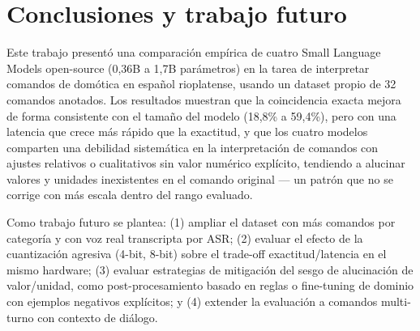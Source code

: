 \section{Conclusiones y trabajo futuro}

Este trabajo presentó una comparación empírica de cuatro Small Language
Models open-source (0,36B a 1,7B parámetros) en la tarea de interpretar
comandos de domótica en español rioplatense, usando un dataset propio de
32 comandos anotados. Los resultados muestran que la coincidencia exacta
mejora de forma consistente con el tamaño del modelo (18,8\% a 59,4\%),
pero con una latencia que crece más rápido que la exactitud, y que los
cuatro modelos comparten una debilidad sistemática en la interpretación de
comandos con ajustes relativos o cualitativos sin valor numérico explícito,
tendiendo a alucinar valores y unidades inexistentes en el comando
original — un patrón que no se corrige con más escala dentro del rango
evaluado.

Como trabajo futuro se plantea: (1) ampliar el dataset con más comandos por
categoría y con voz real transcripta por ASR; (2) evaluar el efecto de la
cuantización agresiva (4-bit, 8-bit) sobre el trade-off exactitud/latencia
en el mismo hardware; (3) evaluar estrategias de mitigación del sesgo de
alucinación de valor/unidad, como post-procesamiento basado en reglas o
fine-tuning de dominio con ejemplos negativos explícitos; y (4) extender la
evaluación a comandos multi-turno con contexto de diálogo.
